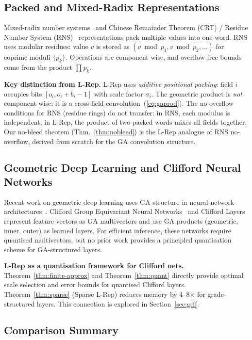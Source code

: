 \documentclass[11pt,a4paper]{article}
\theoremstyle{definition}
\theoremstyle{plain}
\theoremstyle{remark}
\begin{document}
\subsection{Packed and Mixed-Radix Representations}
\label{sec:related-packed}

Mixed-radix number systems~\cite{knuth1998} and Chinese Remainder
Theorem (CRT) / Residue Number System (RNS)~\cite{crt_fpga}
representations pack multiple values into one word.
RNS uses modular residues: value $v$ is stored as
$(v \bmod p_1, v \bmod p_2, \ldots)$ for coprime moduli $\{p_k\}$.
Operations are component-wise, and overflow-free bounds come from the
product $\prod p_k$.

\textbf{Key distinction from L-Rep.}
L-Rep uses \emph{additive positional packing}: field $i$ occupies
bits $[o_i, o_i + b_i - 1]$ with scale factor $\sigma_i$.
The geometric product is \emph{not} component-wise; it is a cross-field
convolution~(\ref{eq:gaprod}).
The no-overflow conditions for RNS (residue rings) do not transfer:
in RNS, each modulus is independent; in L-Rep, the product of two
packed words mixes all fields together.
Our no-bleed theorem (Thm.~\ref{thm:nobleed}) is the L-Rep analogue of
RNS no-overflow, derived from scratch for the GA convolution structure.

\subsection{Geometric Deep Learning and Clifford Neural Networks}
\label{sec:related-gdl}

Recent work on geometric deep learning uses GA structure in neural
network architectures~\cite{brandstetter2023,ruhe2023}.
Clifford Group Equivariant Neural Networks~\cite{ruhe2023} and
Clifford Layers~\cite{brandstetter2023} represent feature vectors as
GA multivectors and use GA products (geometric, inner, outer) as
learned layers.
For efficient inference, these networks require quantised multivectors,
but no prior work provides a principled quantisation scheme for
GA-structured layers.

\textbf{L-Rep as a quantisation framework for Clifford nets.}
Theorem~\ref{thm:finite-approx} and Theorem~\ref{thm:quant} directly
provide optimal scale selection and error bounds for quantised Clifford
layers.
Theorem~\ref{thm:sparse} (Sparse L-Rep) reduces memory by 4--8$\times$
for grade-structured layers.
This connection is explored in Section~\ref{sec:gdl}.

\subsection{Comparison Summary}
\end{document}
